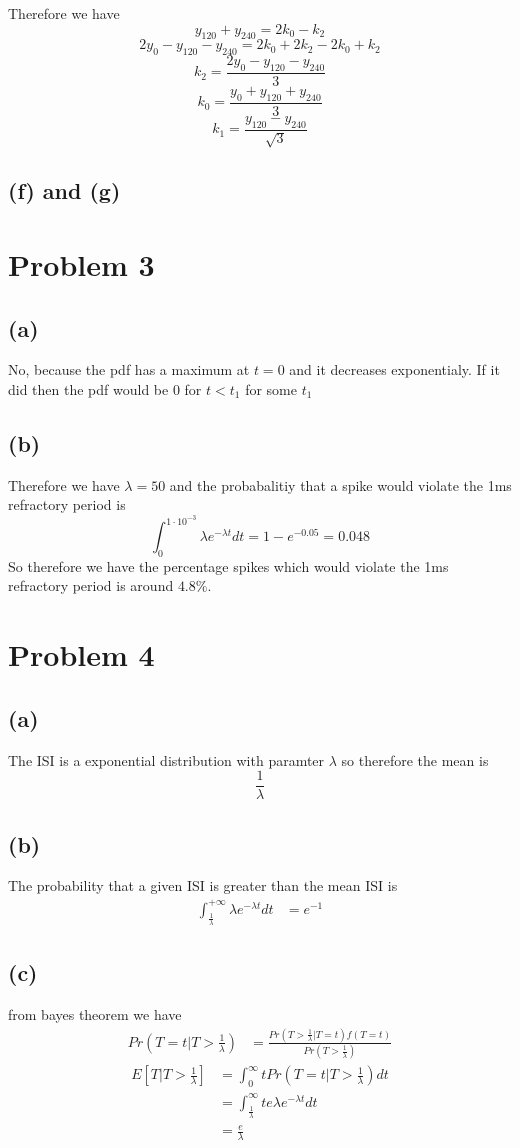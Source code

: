 \documentclass[12pt]{article}
\begin{document}
Therefore we have
$$y_{120}+y_{240}=2k_0-k_2$$
$$2y_0-y_{120}-y_{240}=2k_0+2k_2-2k_0+k_2$$
$$k_2=\boxed{\frac{2y_0-y_{120}-y_{240}}{3}}$$
$$k_0=\boxed{\frac{y_0+y_{120}+y_{240}}{3}}$$
$$k_1=\boxed{\frac{y_{120}-y_{240}}{\sqrt{3}}}$$
\subsection*{(f) and (g)}


\section*{Problem 3}
\subsection*{(a)}
No, because the pdf has a maximum at $t=0$ and it decreases exponentialy. If it did then the pdf would be 0 for $t<t_1$ for some $t_1$
\subsection*{(b)}
Therefore we have $\lambda=50$
and the probabalitiy that a spike would violate the 1ms refractory period is 
$$\int_{0}^{1\cdot10^{-3}}\lambda e^{-\lambda t}dt=1- e^{-0.05}=0.048$$
So therefore we have the percentage spikes which would violate the 1ms refractory period
is around $\boxed{4.8\%}$.
\section*{Problem 4}
\subsection*{(a)}
The ISI is a exponential distribution with paramter $\lambda$ so therefore the mean is
$$\frac{1}{\lambda}$$
\subsection*{(b)}
The probability that a given ISI is greater than the mean ISI is 
\begin{align*}
    \int_{\frac{1}{\lambda}}^{+\infty}\lambda e^{-\lambda t}dt&=\boxed{e^{-1}}
\end{align*}
\subsection*{(c)}
from bayes theorem we have
\begin{align*}
    Pr\left(T=t|T>\frac{1}{\lambda}\right)&=\frac{Pr(T>\frac{1}{\lambda}|T=t)f(T=t)}{Pr(T>\frac{1}{\lambda})} 
\end{align*}
\begin{align*}
    E[T|T>\frac{1}{\lambda}]&=\int_{0}^{\infty}tPr\left(T=t|T>\frac{1}{\lambda}\right)dt\\
    &=\int_{\frac{1}{\lambda}}^{\infty}te \lambda e^{-\lambda t} dt\\
    &=\boxed{\frac{e}{\lambda}}
\end{align*}
\end{document}
